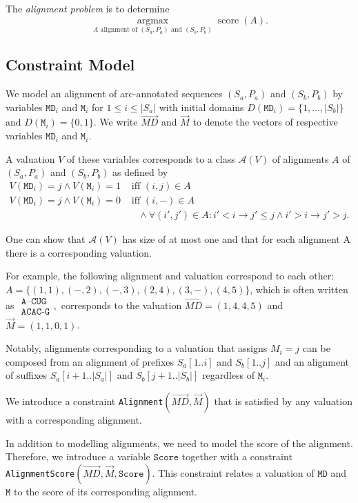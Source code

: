 \documentclass[11pt]{llncs}
\newcommand{\score}{\operatorname{score}}
\newcommand{\argmax}{\operatorname*{arg max}}
\begin{document}
The \emph{alignment problem} is to determine 
\begin{displaymath}
  \argmax_{\text{$A$ alignment of $(S_a,P_a)$ and $(S_b,P_b)$}} \score(A).
\end{displaymath}


\newcommand{\var}{\texttt}
\newcommand{\cA}{{\mathcal A}}
\subsection{Constraint Model}

We model an alignment of arc-annotated sequences $(S_a,P_a)$ and
$(S_b,P_b)$ by variables $\var{MD}_i$ and $\var{M}_i$ for $1\leq i\leq
|S_a|$ with initial domains $D(\var{MD}_i) = \{1,\dots,|S_b|\}$ and
$D(\var{M}_i)=\{0,1\}$. We write $\vec{MD}$ and $\vec{M}$ to
denote the vectors of respective variables $\var{MD}_i$ and
$\var{M}_i$.

A valuation $V$ of these variables corresponds to a class $\cA(V)$ of
alignments $A$ of $(S_a,P_a)$ and $(S_b,P_b)$ as defined by
\begin{align*}
  V(\var{MD}_i)=j \land V(\var{M}_i)=1 &\text{ iff } (i,j) \in A  \\
  V(\var{MD}_i)=j \land V(\var{M}_i)=0 &\text{ iff } (i,-) \in A \\&\quad\land \forall (i',j')\in A: i'< i \rightarrow j'\leq j \land i'>i \rightarrow j'>j.
\end{align*}

One can show that $\cA(V)$ has size of at most one and that for each
alignment A there is a corresponding valuation.

For example, the following alignment and valuation correspond to each
other: $A=\{(1,1),(-,2),(-,3),(2,4),(3,-),(4,5)\}$, which is often written as
$\begin{array}{c}
\texttt{A--CUG}\\
\texttt{ACAC-G}
\end{array},$
corresponds to the valuation $\vec{MD}=(1,4,4,5)$ and $\vec{M}=(1,1,0,1)$.

Notably, alignments corresponding to a valuation that assigns $M_i=j$
can be composed from an alignment of prefixes $S_a[1..i]$ and
$S_b[1..j]$ and an alignment of suffixes $S_a[i+1..|S_a|]$ and $S_b[j+1..|S_b|]$
regardless of $\var{M}_i$.

We introduce a constraint \texttt{Alignment}$(\vec{MD},\vec{M})$ that is
satisfied by any valuation with a corresponding alignment.  

In addition to modelling alignments, we need to model the score of the
alignment. Therefore, we introduce a variable $\var{Score}$ together
with a constraint
\texttt{AlignmentScore}$(\vec{MD},\vec{M},\var{Score})$. This constraint
relates a valuation of $\var{MD}$ and $\var{M}$ to the score of its
corresponding alignment.
\end{document}
